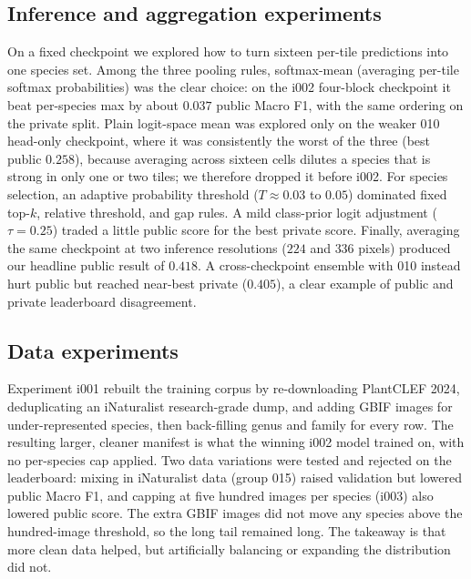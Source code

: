 \subsection{Inference and aggregation experiments}
On a fixed checkpoint we explored how to turn sixteen per-tile predictions into one
species set. Among the three pooling rules, softmax-mean (averaging per-tile softmax
probabilities) was the clear choice: on the i002 four-block checkpoint it beat
per-species max by about $0.037$ public Macro F1, with the same ordering on the
private split. Plain logit-space mean was explored only on the weaker 010 head-only
checkpoint, where it was consistently the worst of the three (best public $0.258$),
because averaging across sixteen cells dilutes a species that is strong in only one or
two tiles; we therefore dropped it before i002. For species selection, an adaptive
probability threshold ($T \approx 0.03$ to $0.05$) dominated fixed top-$k$, relative
threshold, and gap rules. A mild class-prior logit adjustment ($\tau{=}0.25$) traded a
little public score for the best private score. Finally, averaging the same checkpoint
at two inference resolutions ($224$ and $336$ pixels) produced our headline public
result of $0.418$. A cross-checkpoint ensemble with 010 instead hurt public but
reached near-best private ($0.405$), a clear example of public and private leaderboard
disagreement.

\subsection{Data experiments}
Experiment i001 rebuilt the training corpus by re-downloading PlantCLEF 2024,
deduplicating an iNaturalist research-grade dump, and adding GBIF images for
under-represented species, then back-filling genus and family for every row. The
resulting larger, cleaner manifest is what the winning i002 model trained on, with no
per-species cap applied. Two data variations were tested and rejected on the
leaderboard: mixing in iNaturalist data (group 015) raised validation but lowered
public Macro F1, and capping at five hundred images per species (i003) also lowered
public score. The extra GBIF images did not move any species above the hundred-image
threshold, so the long tail remained long. The takeaway is that more clean data helped,
but artificially balancing or expanding the distribution did not.

